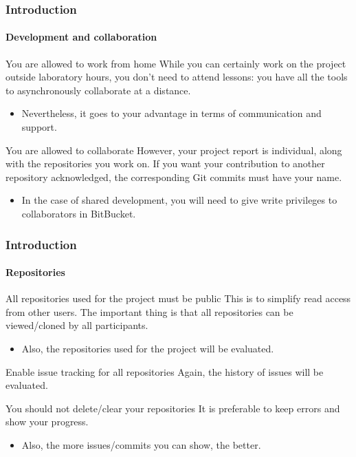 \begin{frame}
\frametitle{Introduction}
\framesubtitle{Development and collaboration}

\begin{block}{You are allowed to work from home}
While you can certainly work on the project outside laboratory hours, you don't need to attend lessons: you
have all the tools to asynchronously collaborate at a distance.
\begin{itemize}
\item Nevertheless, it goes to your advantage in terms of communication and support.
\end{itemize}
\end{block}
\pause
\begin{block}{You are allowed to collaborate}
However, your project report is individual, along with the repositories you work on. If you want your contribution to another
repository acknowledged, the corresponding Git commits must have your name.
\begin{itemize} 
\item In the case of shared development, you will need to give write privileges to collaborators in BitBucket.
\end{itemize}
\end{block}

\end{frame}

\begin{frame}
\frametitle{Introduction}
\framesubtitle{Repositories}

\begin{block}{All repositories used for the project must be public}
This is to simplify read access from other users. The important thing is that all repositories can be viewed/cloned by all participants.
\begin{itemize}
\item Also, the repositories used for the project will be evaluated.
\end{itemize}
\end{block}
\pause
\begin{block}{Enable issue tracking for all repositories}
Again, the history of issues will be evaluated.
\end{block}
\pause
\begin{block}{You should not delete/clear your repositories}
It is preferable to keep errors and show your progress.
\begin{itemize}
\item Also, the more issues/commits you can show, the better.
\end{itemize}
\end{block}
\end{frame}

